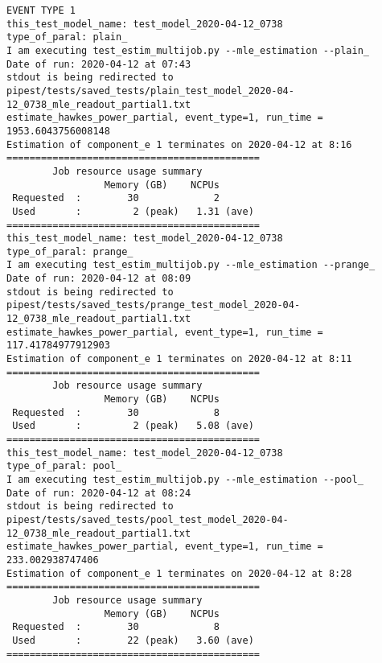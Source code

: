  \begin{Verbatim}[commandchars=\\\{\}, fontsize=\small]
EVENT TYPE 1
this_test_model_name: test_model_2020-04-12_0738
type_of_paral: plain_
I am executing test_estim_multijob.py --mle_estimation --plain_
Date of run: 2020-04-12 at 07:43
stdout is being redirected to pipest/tests/saved_tests/plain_test_model_2020-04-12_0738_mle_readout_partial1.txt
estimate_hawkes_power_partial, event_type=1, run_time = 1953.6043756008148
Estimation of component_e 1 terminates on 2020-04-12 at 8:16
============================================
        Job resource usage summary 
                 Memory (GB)    NCPUs
 Requested  :        30             2
 Used       :         2 (peak)   1.31 (ave)
============================================
this_test_model_name: test_model_2020-04-12_0738
type_of_paral: prange_
I am executing test_estim_multijob.py --mle_estimation --prange_
Date of run: 2020-04-12 at 08:09
stdout is being redirected to pipest/tests/saved_tests/prange_test_model_2020-04-12_0738_mle_readout_partial1.txt
estimate_hawkes_power_partial, event_type=1, run_time = 117.41784977912903
Estimation of component_e 1 terminates on 2020-04-12 at 8:11
============================================
        Job resource usage summary 
                 Memory (GB)    NCPUs
 Requested  :        30             8
 Used       :         2 (peak)   5.08 (ave)
============================================
this_test_model_name: test_model_2020-04-12_0738
type_of_paral: pool_
I am executing test_estim_multijob.py --mle_estimation --pool_
Date of run: 2020-04-12 at 08:24
stdout is being redirected to pipest/tests/saved_tests/pool_test_model_2020-04-12_0738_mle_readout_partial1.txt
estimate_hawkes_power_partial, event_type=1, run_time = 233.002938747406
Estimation of component_e 1 terminates on 2020-04-12 at 8:28
============================================
        Job resource usage summary 
                 Memory (GB)    NCPUs
 Requested  :        30             8
 Used       :        22 (peak)   3.60 (ave)
============================================
 \end{Verbatim}
